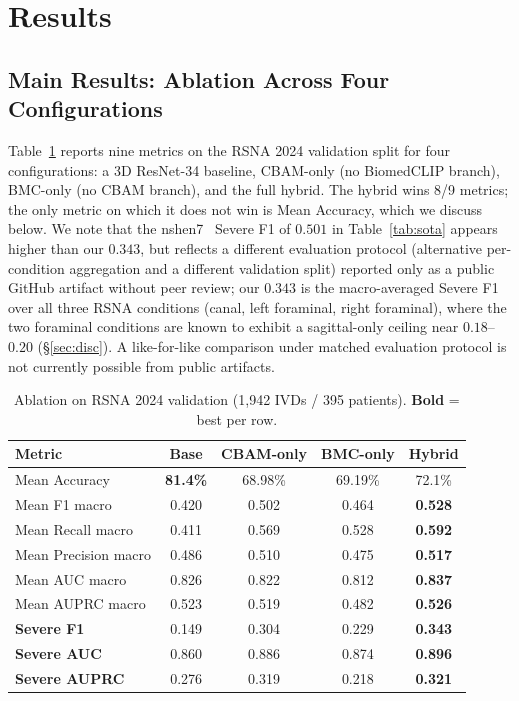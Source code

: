 \documentclass[runningheads]{llncs}
\newcommand{\best}[1]{\textcolor{best}{\textbf{#1}}}
\begin{document}
\section{Results}
\label{sec:results}

\subsection{Main Results: Ablation Across Four Configurations}

Table~\ref{tab:main} reports nine metrics on the RSNA 2024 validation
split for four configurations: a 3D ResNet-34 baseline, CBAM-only
(no BiomedCLIP branch), BMC-only (no CBAM branch), and the full
hybrid. The hybrid wins 8/9 metrics; the only metric on which it does
not win is Mean Accuracy, which we discuss below. We note that the
nshen7~\cite{nshen2024} Severe F1 of $0.501$ in Table~\ref{tab:sota}
appears higher than our $0.343$, but reflects a different evaluation
protocol (alternative per-condition aggregation and a different
validation split) reported only as a public GitHub artifact without
peer review; our
$0.343$ is the macro-averaged Severe F1 over all three RSNA
conditions (canal, left foraminal, right foraminal), where the two
foraminal conditions are known to exhibit a sagittal-only ceiling
near $0.18$--$0.20$ (\S\ref{sec:disc}). A like-for-like comparison
under matched evaluation protocol is not currently possible from
public artifacts.

\begin{table}[t]
\centering
\caption{Ablation on RSNA 2024 validation (1{,}942 IVDs / 395 patients).
\textbf{Bold} = best per row.}
\label{tab:main}
\renewcommand{\arraystretch}{1.05}
\begin{tabular}{@{}lcccc@{}}
\toprule
Metric & Base & CBAM-only & BMC-only & \best{Hybrid} \\
\midrule
Mean Accuracy        & \best{81.4\%} & 68.98\% & 69.19\% & 72.1\% \\
Mean F1 macro        & 0.420 & 0.502 & 0.464 & \best{0.528} \\
Mean Recall macro    & 0.411 & 0.569 & 0.528 & \best{0.592} \\
Mean Precision macro & 0.486 & 0.510 & 0.475 & \best{0.517} \\
Mean AUC macro       & 0.826 & 0.822 & 0.812 & \best{0.837} \\
Mean AUPRC macro     & 0.523 & 0.519 & 0.482 & \best{0.526} \\
\midrule
\textbf{Severe F1}    & 0.149 & 0.304 & 0.229 & \best{0.343} \\
\textbf{Severe AUC}   & 0.860 & 0.886 & 0.874 & \best{0.896} \\
\textbf{Severe AUPRC} & 0.276 & 0.319 & 0.218 & \best{0.321} \\
\bottomrule
\end{tabular}
\end{table}
\end{document}
